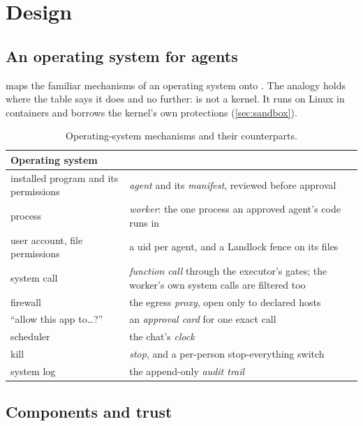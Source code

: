 \section{Design}
\label{sec:design}

\subsection{An operating system for agents}

 maps the familiar mechanisms of an operating system onto
\sys{}. The analogy holds where the table says it does and no further:
\sys{} is not a kernel. It runs on Linux in containers and borrows the
kernel's own protections (\cref{sec:sandbox}).

\begin{table}[t]
\centering\small
\caption{Operating-system mechanisms and their counterparts.}
\label{tab:os}
\begin{tabularx}{\columnwidth}{@{}>{\raggedright\arraybackslash}p{}>{\raggedright\arraybackslash}X@{}}
\toprule
\textbf{Operating system} & \textbf{\sys{}} \\
\midrule
installed program and its permissions & \emph{agent} and its \emph{manifest}, reviewed before approval \\
process & \emph{worker}: the one process an approved agent's code runs in \\
user account, file permissions & a uid per agent, and a Landlock fence on its files \\
system call & \emph{function call} through the executor's gates; the worker's own system calls are filtered too \\
firewall & the egress \emph{proxy}, open only to declared hosts \\
``allow this app to\ldots?'' & an \emph{approval card} for one exact call \\
scheduler & the chat's \emph{clock} \\
kill & \emph{stop}, and a per-person stop-everything switch \\
system log & the append-only \emph{audit trail} \\
\bottomrule
\end{tabularx}
\end{table}

\subsection{Components and trust}

